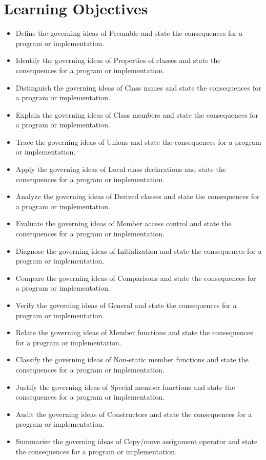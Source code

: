 \documentclass[11pt,letterpaper]{article}
\begin{document}
\section{Learning Objectives}
\begin{itemize}[label=\textcolor{CornellReferenceTeal}{$\blacktriangleright$}]
\item Define the governing ideas of Preamble and state the consequences for a program or implementation.
\item Identify the governing ideas of Properties of classes and state the consequences for a program or implementation.
\item Distinguish the governing ideas of Class names and state the consequences for a program or implementation.
\item Explain the governing ideas of Class members and state the consequences for a program or implementation.
\item Trace the governing ideas of Unions and state the consequences for a program or implementation.
\item Apply the governing ideas of Local class declarations and state the consequences for a program or implementation.
\item Analyze the governing ideas of Derived classes and state the consequences for a program or implementation.
\item Evaluate the governing ideas of Member access control and state the consequences for a program or implementation.
\item Diagnose the governing ideas of Initialization and state the consequences for a program or implementation.
\item Compare the governing ideas of Comparisons and state the consequences for a program or implementation.
\item Verify the governing ideas of General and state the consequences for a program or implementation.
\item Relate the governing ideas of Member functions and state the consequences for a program or implementation.
\item Classify the governing ideas of Non-static member functions and state the consequences for a program or implementation.
\item Justify the governing ideas of Special member functions and state the consequences for a program or implementation.
\item Audit the governing ideas of Constructors and state the consequences for a program or implementation.
\item Summarize the governing ideas of Copy/move assignment operator and state the consequences for a program or implementation.
\end{itemize}
\end{document}
